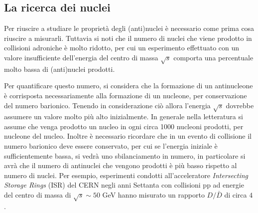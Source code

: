 \subsection{La ricerca dei nuclei}
Per riuscire a studiare le proprietà degli (anti)nuclei è necessario come prima cosa riuscire a misurarli.
Tuttavia si noti che il numero di nuclei che viene prodotto in collisioni adroniche è molto ridotto, per cui un esperimento effettuato con un valore insufficiente dell'energia del centro di massa $\sqrt s$ comporta una percentuale molto bassa di (anti)nuclei prodotti.

Per quantificare questo numero, si considera che la formazione di un antinucleone è corrisposta necessariamente alla formazione di un nucleone, per conservazione del numero barionico.
Tenendo in considerazione ciò allora l'energia $\sqrt s$ dovrebbe assumere un valore molto più alto inizialmente.
In generale nella letteratura si assume che venga prodotto un nucleo in ogni circa 1000 nucleoni prodotti, per nucleone del nucleo. 
Inoltre è necessario ricordare che in un evento di collisione il numero barionico deve essere conservato, per cui se l'energia iniziale è sufficientemente bassa, si vedrà uno sbilanciamento in numero, in particolare si avrà che il numero di antinuclei che vengono prodotti è più basso rispetto al numero di nuclei.
Per esempio, esperimenti condotti all'acceleratore \emph{Intersecting Storage Rings} (ISR) del CERN negli anni Settanta con collisioni pp ad energie del centro di massa di $\sqrt s \sim 50$ GeV hanno misurato un rapporto $D/\bar D$ di circa $4$ \cite{Gibson_Duane_Newman_Ogren_Henning_Jarlskog_Little_Sanford_Wu_B&Oslash;ggild_etal._2008}.

